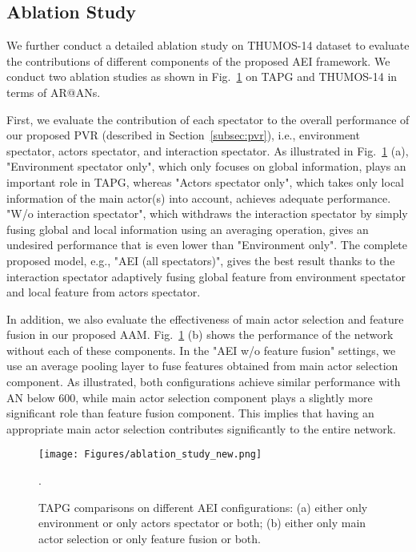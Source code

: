 \documentclass{bmvc2k}
\begin{document}
\subsection{Ablation Study}

We further conduct a detailed ablation study on THUMOS-14 dataset to evaluate the contributions of different components of the proposed AEI framework. We conduct two ablation studies as shown in Fig.~\ref{ablation_fig} on TAPG and THUMOS-14 in terms of AR@ANs.

First, we evaluate the contribution of each spectator to the overall performance of our proposed PVR (described in Section~\ref{subsec:pvr}), i.e., environment spectator, actors spectator, and interaction spectator. As illustrated in Fig.~\ref{ablation_fig} (a), "Environment spectator only", which only focuses on global information, plays an important role in TAPG, whereas "Actors spectator only", which takes only local information of the main actor(s) into account, achieves adequate performance. "W/o interaction spectator", which withdraws the interaction spectator by simply fusing global and local information using an averaging operation, gives an undesired performance that is even lower than "Environment only". The complete proposed model, e.g., "AEI (all spectators)", gives the best result thanks to the interaction spectator adaptively fusing global feature from environment spectator and local feature from actors spectator.

In addition, we also evaluate the effectiveness of main actor selection and feature fusion in our proposed AAM. Fig.~\ref{ablation_fig} (b) shows the performance of the network without each of these components. In the "AEI w/o feature fusion" settings, we use an average pooling layer to fuse features obtained from main actor selection component. As illustrated, both configurations achieve similar performance with AN below 600, while main actor selection component plays a slightly more significant role than feature fusion component. This implies that having an appropriate main actor selection contributes significantly to the entire network.










\begin{figure}[t]
\centering
  \texttt{[image: Figures/ablation\_study\_new.png]}
  \vspace*{-0.1cm}
  \caption{TAPG comparisons on different AEI configurations: (a) either only environment or only actors spectator or both; (b) either only main actor selection or only feature fusion or both.}.
\label{ablation_fig}
  \vspace*{-0.4cm}
\end{figure}
\end{document}
